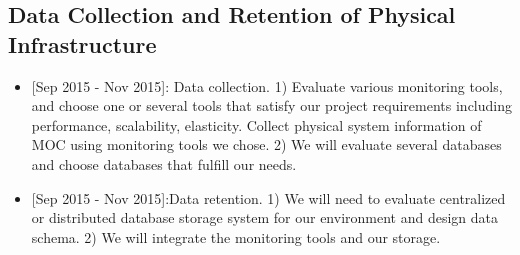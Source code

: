 \subsection{Data Collection and Retention of Physical Infrastructure}

\begin{itemize}
\item{[Sep 2015 - Nov 2015]:} Data collection. 1) Evaluate various monitoring tools, and choose one or several tools that satisfy our project requirements including performance, scalability, elasticity. Collect physical system information of MOC using monitoring tools we chose. 2) We will evaluate several databases and choose databases that fulfill our needs. 
\item{[Sep 2015 - Nov 2015]:}Data retention. 1) We will need to evaluate centralized or distributed database storage system for our environment and design data schema. 2) We will integrate the monitoring tools and our storage.
\end{itemize}